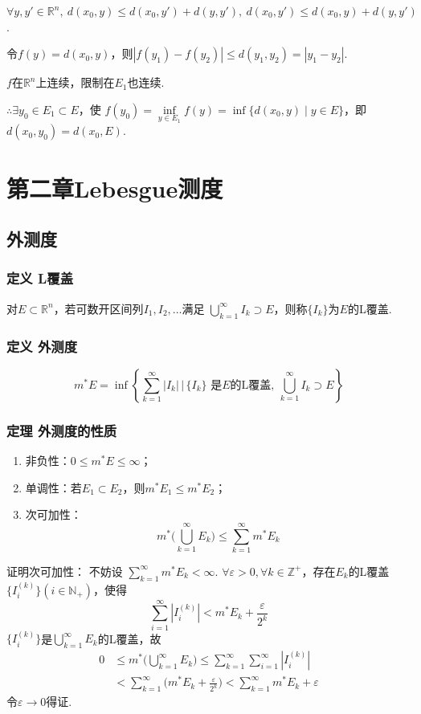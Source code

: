 \documentclass{article}
\begin{document}
	$\forall y,y'\in\mathbb{R}^n,\ d(x_0,y)\le d(x_0,y')+d(y,y'),\ d(x_0,y')\le d(x_0,y)+d(y,y')$.
	
	令$f(y)=d(x_0,y)$，则$|f(y_1)-f(y_2)|\le d(y_1,y_2)=|y_1-y_2|$.
	
	$f$在$\mathbb{R}^n$上连续，限制在$E_1$也连续.
	
	$\therefore\exists y_0\in E_1\subset E$，使 $f(y_0)=\inf\limits_{y\in E_1}f(y)=\inf\{d(x_0,y)\mid y\in E\}$，即 $d(x_0,y_0)=d(x_0,E)$.
	
	\section{第二章\quad Lebesgue测度}
	\subsection{外测度}
	\subsubsection{定义 L覆盖}
	对$E\subset\mathbb{R}^n$，若可数开区间列$I_1,I_2,\dots$满足 $\bigcup\limits_{k=1}^{\infty}I_k\supset E$，则称$\{I_k\}$为$E$的L覆盖.
	
	\subsubsection{定义 外测度}
	\[
	\displaystyle m^*E = \inf\left\{ \sum_{k=1}^{\infty}|I_k| \,\bigg|\, \{I_k\} \text{ 是}E\text{的L覆盖},\ \bigcup_{k=1}^{\infty}I_k\supset E \right\}
	\]
	
	\subsubsection{定理 外测度的性质}
	\begin{enumerate}
		\item 非负性：$0\le m^*E\le\infty$；
		\item 单调性：若$E_1\subset E_2$，则$m^*E_1\le m^*E_2$；
		\item 次可加性：
		\[
		\displaystyle m^*\Big(\bigcup_{k=1}^{\infty}E_k\Big) \le \sum_{k=1}^{\infty}m^*E_k
		\]
	\end{enumerate}
	证明次可加性：
	不妨设 $\sum\limits_{k=1}^{\infty}m^*E_k<\infty$.
	$\forall \varepsilon>0,\forall k\in\mathbb{Z}^+$，存在$E_k$的L覆盖$\{I_i^{(k)}\}(i\in\mathbb{N}_+)$，使得
	\[
	\sum_{i=1}^{\infty}|I_i^{(k)}| < m^*E_k + \frac{\varepsilon}{2^k}
	\]
	$\{I_i^{(k)}\}$是$\bigcup\limits_{k=1}^{\infty}E_k$的L覆盖，故
	\[
	\begin{aligned}
		0&\le m^*\Big(\bigcup_{k=1}^{\infty}E_k\Big) \le \sum_{k=1}^{\infty}\sum_{i=1}^{\infty}|I_i^{(k)}| \\
		&< \sum_{k=1}^{\infty}\Big(m^*E_k+\frac{\varepsilon}{2^k}\Big) < \sum_{k=1}^{\infty}m^*E_k + \varepsilon
	\end{aligned}
	\]
	令$\varepsilon\to0$得证.
	
\end{document}
